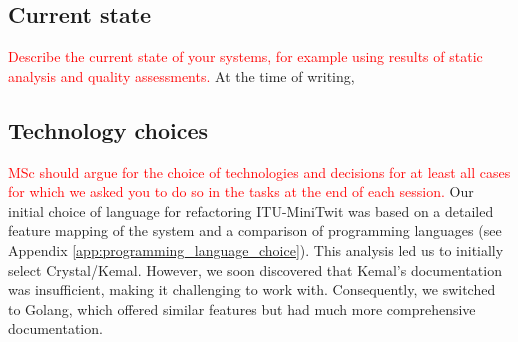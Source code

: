 \subsection{Current state}
\textcolor{red}{Describe the current state of your systems, for example using results of static analysis and quality assessments.}
At the time of writing, 

\subsection{Technology choices}%
\textcolor{red}{MSc should argue for the choice of technologies and decisions for at least all cases for which we asked you to do so in the tasks at the end of each session.}
Our initial choice of language for refactoring ITU-MiniTwit was based on a detailed feature mapping of the system and a comparison of programming languages (see Appendix \ref{app:programming_language_choice}). 
This analysis led us to initially select Crystal/Kemal. However, we soon discovered that Kemal's documentation was insufficient, making it challenging to work with. Consequently, we switched to Golang, which offered similar features but had much more comprehensive documentation.